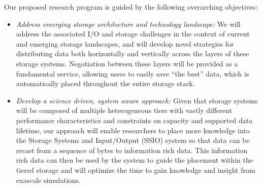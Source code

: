 % 
Our proposed research program is guided by the following overarching objectives:
\begin{itemize}
\item
{\em Address emerging storage architecture and technology landscape:}
We will address the associated I/O and storage challenges in the context of
current and emerging storage landscapes,
and will develop novel strategies for distributing 
data both horizontally and vertically across the layers of these storage systems.  
Negotiation between these layers will be provided as a fundamental service, allowing users to
easily save ``the best''  data, which is automatically placed throughout the
entire storage stack.
\item
{\em Develop a science driven, system aware approach:}
%
Given that storage systems will be composed of multiple heterogeneous tiers with
vastly different performance characteristics and constraints on capacity and 
supported data lifetime, our approach will enable researchers to 
place more knowledge into the Storage Systems and Input/Output (SSIO) system so that data can be recast from 
a sequence of bytes to information rich data. This information rich data can then
be used by the system to guide the  placement within the tiered storage and will optimize the time
to gain knowledge and insight from exascale simulations.



\end{itemize}
